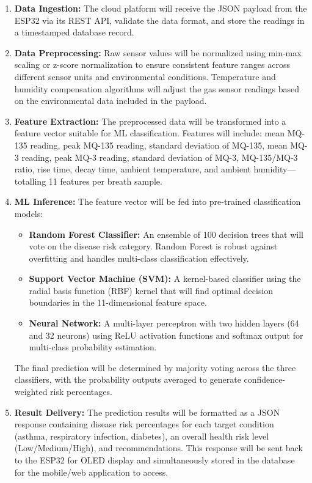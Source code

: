 \begin{enumerate}[leftmargin=1.5cm]
\item \textbf{Data Ingestion:} The cloud platform will receive the JSON payload from the ESP32 via its REST API, validate the data format, and store the readings in a timestamped database record.

\item \textbf{Data Preprocessing:} Raw sensor values will be normalized using min-max scaling or z-score normalization to ensure consistent feature ranges across different sensor units and environmental conditions. Temperature and humidity compensation algorithms will adjust the gas sensor readings based on the environmental data included in the payload.

\item \textbf{Feature Extraction:} The preprocessed data will be transformed into a feature vector suitable for ML classification. Features will include: mean MQ-135 reading, peak MQ-135 reading, standard deviation of MQ-135, mean MQ-3 reading, peak MQ-3 reading, standard deviation of MQ-3, MQ-135/MQ-3 ratio, rise time, decay time, ambient temperature, and ambient humidity---totalling 11 features per breath sample.

\item \textbf{ML Inference:} The feature vector will be fed into pre-trained classification models:
\begin{itemize}
\item \textbf{Random Forest Classifier:} An ensemble of 100 decision trees that will vote on the disease risk category. Random Forest is robust against overfitting and handles multi-class classification effectively.
\item \textbf{Support Vector Machine (SVM):} A kernel-based classifier using the radial basis function (RBF) kernel that will find optimal decision boundaries in the 11-dimensional feature space.
\item \textbf{Neural Network:} A multi-layer perceptron with two hidden layers (64 and 32 neurons) using ReLU activation functions and softmax output for multi-class probability estimation.
\end{itemize}
The final prediction will be determined by majority voting across the three classifiers, with the probability outputs averaged to generate confidence-weighted risk percentages.

\item \textbf{Result Delivery:} The prediction results will be formatted as a JSON response containing disease risk percentages for each target condition (asthma, respiratory infection, diabetes), an overall health risk level (Low/Medium/High), and recommendations. This response will be sent back to the ESP32 for OLED display and simultaneously stored in the database for the mobile/web application to access.
\end{enumerate}

